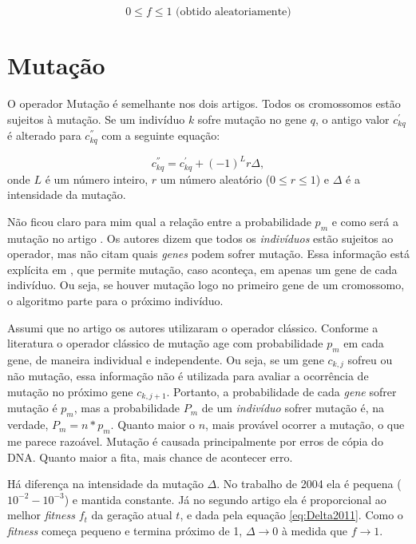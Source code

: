 	\begin{equation}
	0 \leq f \leq 1 \mbox{       (obtido aleatoriamente)}
	\end{equation}

\section{Mutação}

	O operador Mutação é semelhante nos dois artigos. Todos os cromossomos estão sujeitos à mutação. Se um indivíduo $k$ sofre mutação no gene $q$, o antigo valor $c^{'}_{kq}$ é alterado para $c^{''}_{kq}$ com a seguinte equação:

		\begin{equation}\label{eq:mutacao}
			c^{''}_{kq} = c^{'}_{kq} + (-1)^{L} r \Delta,
		\end{equation}
		onde $L$ é um número inteiro, $r$ um número aleatório ($0 \leq r \leq 1$) e $\Delta$ é a intensidade da mutação.
		
		
	Não ficou claro para mim qual a relação entre a probabilidade $p_m$ e como será a mutação no artigo \cite{metodo2004}. Os autores dizem que todos os \emph{indivíduos} estão sujeitos ao operador, mas não citam quais \emph{genes} podem sofrer mutação. Essa informação está explícita em \cite{metodo2011}, que permite mutação, caso aconteça, em apenas um gene de cada indivíduo. Ou seja, se houver mutação logo no primeiro gene de um cromossomo, o algoritmo parte para o próximo indivíduo.
	
	Assumi que no artigo \cite{metodo2004} os autores utilizaram o operador clássico. Conforme a literatura \cite{Mitchell98, Linden2008} o operador clássico de mutação age com probabilidade $p_m$ em cada gene, de maneira individual e independente. Ou seja, se um gene $c_{k,j}$ sofreu ou não mutação, essa informação não é utilizada para avaliar a ocorrência de mutação no próximo gene $c_{k,j+1}$. Portanto, a probabilidade de cada \emph{gene} sofrer mutação é $p_m$, mas a probabilidade $P_m$ de um \emph{indivíduo} sofrer mutação é, na verdade, $P_m = n*p_m$. Quanto maior o $n$, mais provável ocorrer a mutação, o que me parece razoável. Mutação é causada principalmente por erros de cópia do DNA. Quanto maior a fita, mais chance de acontecer erro.

	Há diferença na intensidade da mutação $\Delta$. No trabalho de 2004 ela é pequena ($10^{-2}-10^{-3}$) e mantida constante. Já no segundo artigo ela é proporcional ao melhor \emph{fitness} $f_t$ da geração atual $t$, e dada pela equação \ref{eq:Delta2011}. Como o \emph{fitness} começa pequeno e termina próximo de 1, $\Delta \rightarrow 0$ à medida que $f \rightarrow 1$.

